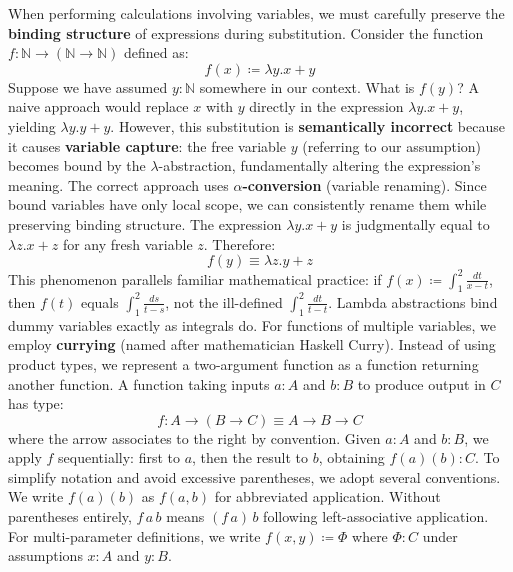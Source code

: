 When performing calculations involving variables, we must carefully preserve the \textbf{binding structure} of expressions during substitution. Consider the function $f : \mathbb{N} \to (\mathbb{N} \to \mathbb{N})$ defined as:
$$ f(x) \coloneqq \lambda y. x + y $$
Suppose we have assumed $y : \mathbb{N}$ somewhere in our context. What is $f(y)$?
A naive approach would replace $x$ with $y$ directly in the expression $\lambda y. x + y$, yielding $\lambda y. y + y$. However, this substitution is \textbf{semantically incorrect} because it causes \textbf{variable capture}: the free variable $y$ (referring to our assumption) becomes bound by the $\lambda$-abstraction, fundamentally altering the expression's meaning.
The correct approach uses \textbf{$\alpha$-conversion} (variable renaming).
Since bound variables have only local scope, we can consistently rename them while preserving binding structure.
The expression $\lambda y. x + y$ is judgmentally equal to $\lambda z. x + z$ for any fresh variable $z$. Therefore:
$$ f(y) \equiv \lambda z. y + z $$
This phenomenon parallels familiar mathematical practice: if $f(x) \coloneqq \int_1^2 \frac{dt}{x-t}$,
then $f(t)$ equals $\int_1^2 \frac{ds}{t-s}$, not the ill-defined $\int_1^2 \frac{dt}{t-t}$.
Lambda abstractions bind dummy variables exactly as integrals do.
For functions of multiple variables, we employ \textbf{currying} (named after mathematician Haskell Curry). Instead of using product types, we represent a two-argument function as a function returning another function.
A function taking inputs $a : A$ and $b : B$ to produce output in $C$ has type:
$$ f : A \to (B \to C) \equiv A \to B \to C $$
where the arrow associates to the right by convention.
Given $a : A$ and $b : B$, we apply $f$ sequentially: first to $a$, then the result to $b$, obtaining $f(a)(b) : C$.
To simplify notation and avoid excessive parentheses, we adopt several conventions. We write $f(a)(b)$ as $f(a, b)$ for abbreviated application. Without parentheses entirely, $f \, a \, b$ means $(f \, a) \, b$ following left-associative application. For multi-parameter definitions, we write $f(x, y) \coloneqq \Phi$ where $\Phi : C$ under assumptions $x : A$ and $y : B$.
